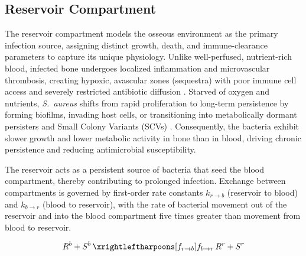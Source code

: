 \documentclass[12pt, draftcls, onecolumn]{IEEEtran}
\begin{document}
\subsection{Reservoir Compartment}
The reservoir compartment models the osseous environment as the primary infection source, assigning distinct growth, death, and immune-clearance parameters to capture its unique physiology. Unlike well-perfused, nutrient-rich blood, infected bone undergoes localized inflammation and microvascular thrombosis, creating hypoxic, avascular zones (sequestra) with poor immune cell access and severely restricted antibiotic diffusion \cite{MomoduSavaliya2023}. Starved of oxygen and nutrients, \textit{S.~aureus} shifts from rapid proliferation to long-term persistence by forming biofilms, invading host cells, or transitioning into metabolically dormant persisters and Small Colony Variants (SCVs) \cite{Beenken2026,Masters2021}. Consequently, the bacteria exhibit slower growth and lower metabolic activity in bone than in blood, driving chronic persistence and reducing antimicrobial susceptibility.

The reservoir acts as a persistent source of bacteria that seed the blood compartment, thereby
contributing to prolonged infection. Exchange between compartments is governed by first-order rate
constants $k_{r \to b}$ (reservoir to blood) and $k_{b \to r}$ (blood to reservoir), with the rate of bacterial movement out of the reservoir and into the blood compartment five times greater than movement from blood to reservoir.




\begin{equation}
R^{b} + S^{b}
\,
\xrightleftharpoons[f_{r \to b}]{f_{b \to r}}
\,
R^{r} + S^{r}
\end{equation}
\end{document}
